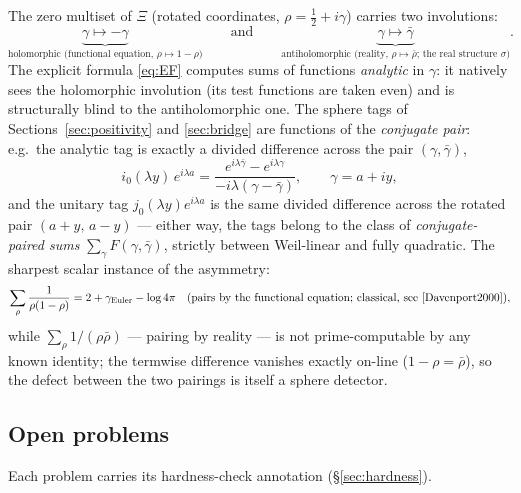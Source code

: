 \documentclass[11pt]{amsart}
\theoremstyle{plain}
\theoremstyle{definition}
\theoremstyle{remark}
\begin{document}
The zero multiset of $\Xi$ (rotated coordinates, $\rho=\tfrac12+i\gamma$) carries two
involutions:
\[
\underbrace{\gamma\mapsto-\gamma}_{\text{holomorphic (functional equation, }
\rho\mapsto1-\rho)}
\qquad\text{and}\qquad
\underbrace{\gamma\mapsto\bar\gamma}_{\text{antiholomorphic (reality, }\rho\mapsto\bar\rho
\text{; the real structure }\sigma)} .
\]
The explicit formula \eqref{eq:EF} computes sums of functions \emph{analytic} in $\gamma$: it
natively sees the holomorphic involution (its test functions are taken even) and is structurally
blind to the antiholomorphic one. The sphere tags of Sections~\ref{sec:positivity} and
\ref{sec:bridge} are functions of the \emph{conjugate pair}: e.g.\ the analytic tag is exactly a
divided difference across the pair $(\gamma,\bar\gamma)$,
\[
i_0(\lambda y)\,e^{i\lambda a}
=\frac{e^{i\lambda\bar\gamma}-e^{i\lambda\gamma}}{-i\lambda(\gamma-\bar\gamma)},
\qquad\gamma=a+iy,
\]
and the unitary tag $j_0(\lambda y)e^{i\lambda a}$ is the same divided difference across the
rotated pair $(a+y,\,a-y)$ --- either way, the tags belong to the
class of \emph{conjugate-paired sums} $\sum_\gamma F(\gamma,\bar\gamma)$, strictly between
Weil-linear and fully quadratic. The sharpest scalar instance of the asymmetry:
\[
\sum_\rho\frac1{\rho(1-\rho)}=2+\gamma_{\mathrm{Euler}}-\log4\pi
\quad(\text{pairs by the functional equation; classical, see
\cite[Ch.~12]{Davenport2000}}),
\]
while $\sum_\rho1/(\rho\bar\rho)$ --- pairing by reality --- is not prime-computable by any
known identity; the termwise difference vanishes exactly on-line ($1-\rho=\bar\rho$), so the
defect between the two pairings is itself a sphere detector.

\begin{center}
\end{center}

\subsection{Open problems}

Each problem carries its hardness-check annotation (\S\ref{sec:hardness}).
\end{document}
